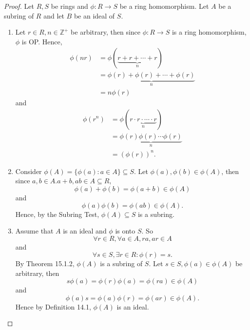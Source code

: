 \documentclass{article}
\theoremstyle{definition}
\begin{document}
\begin{proof}
     Let $R,S$ be rings and $\phi:R\to S$ be a ring homomorphism. Let $A$ be a subring of $R$ and let $B$ be an ideal of $S$.
     \begin{enumerate}
         \item Let $r\in R, n\in \mathbb{Z}^+$ be arbitrary, then since $\phi:R\to S$ is a ring homomorphism, $\phi$ is OP. Hence,
         \begin{align*}
             \phi(nr)&=\phi(\underbrace{r+r+\cdots+r}_n)\\
             &=\underbrace{\phi(r)+\phi(r)+\cdots+\phi(r)}_n\\
             &=n\phi(r)
         \end{align*}
         and
         \begin{align*}
             \phi(r^n)&=\phi(\underbrace{r\cdot r \cdot\cdots\cdot r}_n)\\
             &=\underbrace{\phi(r)\phi(r)\cdots\phi(r)}_n\\
             &=(\phi(r))^n.
         \end{align*}
         
         \item Consider $\phi(A)=\{\phi(a):a\in A\}\subseteq S$. Let $\phi(a),\phi(b)\in\phi(A)$, then since $a,b\in A. a+b,ab\in A\subseteq R$,
         \begin{equation*}
             \phi(a)+\phi(b)=\phi(a+b)\in \phi(A)
         \end{equation*}
         and
         \begin{equation*}
             \phi(a)\phi(b)=\phi(ab)\in \phi(A).
         \end{equation*}
         Hence, by the Subring Test, $\phi(A)\subseteq S$ is a subring.
         
         \item Assume that $A$ is an ideal and $\phi$ is onto $S$. So 
         \begin{equation*}
             \forall r \in R, \forall a \in A, ra,ar\in A
         \end{equation*}
          and 
          \begin{equation*}
              \forall s\in S, \exists r\in R: \phi(r)=s.
          \end{equation*}
         By Theorem 15.1.2, $\phi(A)$ is a subring of $S$. Let $s\in S, \phi(a)\in \phi(A)$ be arbitrary, then
         \begin{equation*}
             s\phi(a)=\phi(r)\phi(a)=\phi(ra)\in\phi(A)
         \end{equation*}
         and
         \begin{equation*}
             \phi(a)s=\phi(a)\phi(r)=\phi(ar)\in\phi(A).
         \end{equation*}
         Hence by Definition 14.1, $\phi(A)$ is an ideal.
         

\end{enumerate}
\end{proof}
\end{document}
